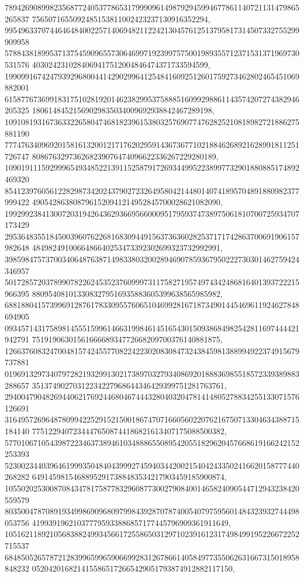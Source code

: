 \documentclass[12pt]{article}
\begin{document}
789426908998235687724053778653179990961498792945994677861140721131479865265837
7565071655092485153811002423237130916352294, 
995496337074464648400225714069482112242130457612513795817314507332755299909958
578843818995371375459096557306469971923997575001989355712371531371969730531576
4030242310284069417512004846474371733594599, 
199099167424793929680044142902996412548416092512601759273462802465451069882001
615877673699183175102819201462382995375888516099298861143574207274382946205325
18061484521569029835034009692938842467289198, 
109108193167363322658047468182396153803257690774762825210818982721886275881190
777476340969201581613200121717620295914367367710218846268921628991811251726747
808676329736268239076474096622336267229280189, 
109019111592999654934852213911525879172693449952238997732901880885174892469320
854123976056122829873420243790272326495804214480140741895704891880982377999422
4905428638087961520941214952845700028621082090, 
199299238413007203194264362936695660009517959374738975061810700725934707173429
295364835518450039607622681683094491563736360282537171742863700691906157982648
4849824910066486640253473392302699323732992991, 
398598475737003406487638714983380320028946907859367950222730301462759424346957
501728572037899078226245352376099973117582719574974342486816401393722215966395
8809540810133083279516935883605399638565985982, 
688188041573996912876178330955760651046992816718734901445469611924627848694905
093457143175898145551599614663199846145165430150938684982542811697444421942791
7519190630156166668934772668209700376140881875, 
126637608324700481574245577082242230208308473243845981388994922374915679737881
019691329734079728219329913021738970327934086920188836985518572339389883288657
35137490270312234227968644346429399751281763761, 
294004790482694406217692446804674443280403204781414805278834255133071576126691
316495726964878099422529152150018674707166056022076216750713304634388715184140
77512294072344476508744186821613407175088500382, 
577010671054398722346373894610348886550895420551829620457668619166242152253393
523002344039646199935048404399927459403442002154042433502416620158777440268282
64914598154688952917388483534217903459185900874, 
105502025300870843478175877832960877300279084001465824090544712943238420559579
803500478708919349986909680979984392870787400540797595601484323932744498053756
419939196210377795933886857177445796909361911649, 
105162118921056838824993456617255865031297102391612317498499195226672252715537
684850526578721283996599659066992831267866140584977355062631667315018958848232
0520420168214155865172665429051793874912882117150, 
\end{document}
